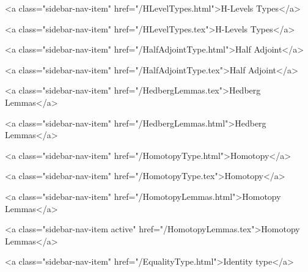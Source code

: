       
        
          <a class="sidebar-nav-item" href="/HLevelTypes.html">H-Levels Types</a>
        
      
    
      
        
          <a class="sidebar-nav-item" href="/HLevelTypes.tex">H-Levels Types</a>
        
      
    
      
        
          <a class="sidebar-nav-item" href="/HalfAdjointType.html">Half Adjoint</a>
        
      
    
      
        
          <a class="sidebar-nav-item" href="/HalfAdjointType.tex">Half Adjoint</a>
        
      
    
      
        
          <a class="sidebar-nav-item" href="/HedbergLemmas.tex">Hedberg Lemmas</a>
        
      
    
      
        
          <a class="sidebar-nav-item" href="/HedbergLemmas.html">Hedberg Lemmas</a>
        
      
    
      
        
          <a class="sidebar-nav-item" href="/HomotopyType.html">Homotopy</a>
        
      
    
      
        
          <a class="sidebar-nav-item" href="/HomotopyType.tex">Homotopy</a>
        
      
    
      
        
          <a class="sidebar-nav-item" href="/HomotopyLemmas.html">Homotopy Lemmas</a>
        
      
    
      
        
          <a class="sidebar-nav-item active" href="/HomotopyLemmas.tex">Homotopy Lemmas</a>
        
      
    
      
        
          <a class="sidebar-nav-item" href="/EqualityType.html">Identity type</a>
        
      
    
